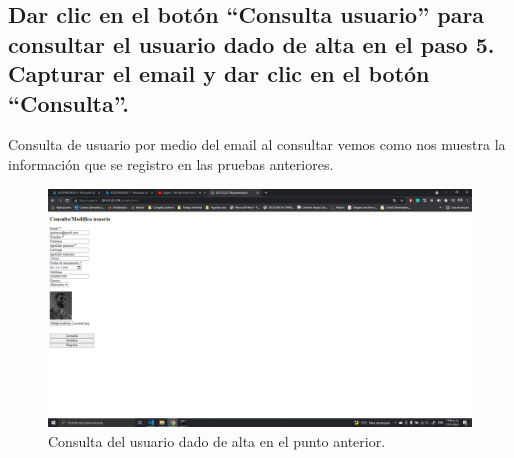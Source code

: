 \documentclass[11pt]{article}
\begin{document}
		\subsection{Dar clic en el botón ``Consulta usuario'' para consultar el usuario dado de alta en el paso 5.  Capturar el email y dar clic en el botón ``Consulta''.}
		Consulta de usuario por medio del email al consultar vemos como nos muestra la información que se registro en las pruebas anteriores.
		\begin{figure}[H]
			\centering
			\includegraphics[scale=0.34]{resources/p9.4.png}
			\caption{Consulta del usuario dado de alta en el punto anterior.}\label{fig:picture}
		\end{figure}
\end{document}
